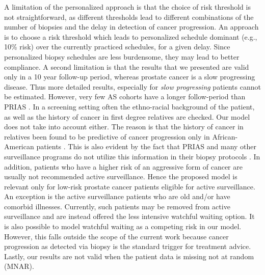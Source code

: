 \documentclass[a4paper, 12pt]{article}
\begin{document}
A limitation of the personalized approach is that the choice of risk threshold is not straightforward, as different thresholds lead to different combinations of the number of biopsies and the delay in detection of cancer progression. An approach is to choose a risk threshold which leads to personalized schedule dominant (e.g., 10\% risk) over the currently practiced schedules, for a given delay. Since personalized biopsy schedules are less burdensome, they may lead to better compliance. A second limitation is that the results that we presented are valid only in a 10 year follow-up period, whereas prostate cancer is a slow progressing disease. Thus more detailed results, especially for \textit{slow progressing} patients cannot be estimated. However, very few AS cohorts have a longer follow-period than PRIAS \citep{bruinsma2016active}. In a screening setting often the ethno-racial background of the patient, as well as the history of cancer in first degree relatives are checked. Our model does not take into account either. The reason is that the history of cancer in relatives been found to be predictive of cancer progression only in African-American patients \citep{goh2013clinical,telang2017prostate}. This is also evident by the fact that PRIAS and many other surveillance programs do not utilize this information in their biopsy protocols \citep{bokhorst2016decade,nieboer2018active}. In addition, patients who have a higher risk of an aggressive form of cancer are usually not recommended active surveillance. Hence the proposed model is relevant only for low-risk prostate cancer patients eligible for active surveillance. An exception is the active surveillance patients who are old and/or have comorbid illnesses. Currently, such patients may be removed from active surveillance and are instead offered the less intensive watchful waiting \citep{bokhorst2016decade} option. It is also possible to model watchful waiting as a competing risk in our model. However, this falls outside the scope of the current work because cancer progression as detected via biopsy is the standard trigger for treatment advice. Lastly, our results are not valid when the patient data is missing not at random (MNAR).
\end{document}
